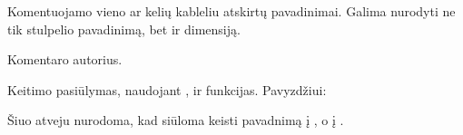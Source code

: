 \documentclass[letterpaper,10pt,lithuanian]{sphinxmanual}
\begin{document}
\begin{fulllineitems}
\label{\detokenize{dimensijos:comment.ref}}
\pysigstartsignatures
\pysigline
{}
\pysigstopsignatures
\sphinxAtStartPar
Komentuojamo vieno ar kelių kableliu atskirtų {\hyperref[\detokenize{formatas:property}]{}}
pavadinimai. Galima nurodyti ne tik stulpelio pavadinimą, bet ir
dimensiją.

\end{fulllineitems}


\begin{fulllineitems}
\label{\detokenize{dimensijos:comment.source}}
\pysigstartsignatures
\pysigline
{}
\pysigstopsignatures
\sphinxAtStartPar
Komentaro autorius.

\end{fulllineitems}


\begin{fulllineitems}
\label{\detokenize{dimensijos:comment.prepare}}
\pysigstartsignatures
\pysigline
{}
\pysigstopsignatures
\sphinxAtStartPar
Keitimo pasiūlymas, naudojant ,  ir  funkcijas. Pavyzdžiui:

\begin{sphinxVerbatim}[commandchars=\\\{\}]
   
\end{sphinxVerbatim}

\sphinxAtStartPar
Šiuo atveju nurodoma, kad siūloma keisti  pavadnimą į
, o  į .

\end{fulllineitems}
\end{document}
